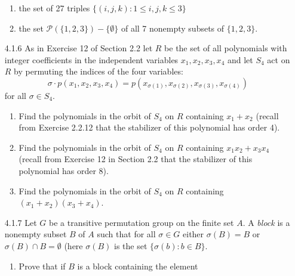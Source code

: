\begin{enumerate}
\begin{enumerate}
                     \item the set of 27 triples $\{(i, j , k) :
                           1 \le i, j, k \le 3\}$
                     \item the set $\mathcal{P}(\{1, 2, 3\}) - \{\emptyset\}$ of
                           all 7 nonempty subsets of $\{1, 2, 3\}$.
                  \end{enumerate}
   \item[4.1.6]   As in Exercise 12 of Section 2.2 let $R$ be the set of all
                  polynomials with integer coefficients in the independent
                  variables $x_1, x_2, x_3, x_4$ and let $S_4$ act on $R$ by
                  permuting the indices of the four variables:
                  $$\sigma \cdot p(x_1, x_2, x_3, x_4) =
                    p(x_{\sigma(1)}, x_{\sigma(2)},
                      x_{\sigma(3)}, x_{\sigma(4)})$$
                  for all $\sigma \in S_4$.
                  \begin{enumerate}
                     \item Find the polynomials in the orbit of $S_4$ on $R$
                           containing $x_1 + x_2$ (recall from Exercise 2.2.12
                           that the stabilizer of this polynomial has order 4).
                     \item Find the polynomials in the orbit of $S_4$ on $R$
                           containing $x_1x_2 + x_3x_4$ (recall from Exercise 12
                           in Section 2.2 that the stabilizer of this polynomial
                           has order 8).
                     \item Find the polynomials in the orbit of $S_4$ on $R$
                           containing $(x_1 + x_2)(x_3 + x_4)$.
                  \end{enumerate}
   \item[4.1.7]   Let $G$ be a transitive permutation group on the finite set
                  $A$. A \textit{block} is a nonempty subset $B$ of $A$ such
                  that for all $\sigma \in G$ either $\sigma(B) = B$ or
                  $\sigma(B) \cap B = \emptyset$ (here $\sigma(B)$ is the set
                  $\{\sigma(b) : b \in B\}$.
                  \begin{enumerate}
                     \item Prove that if $B$ is a block containing the element

\end{enumerate}
\end{enumerate}
